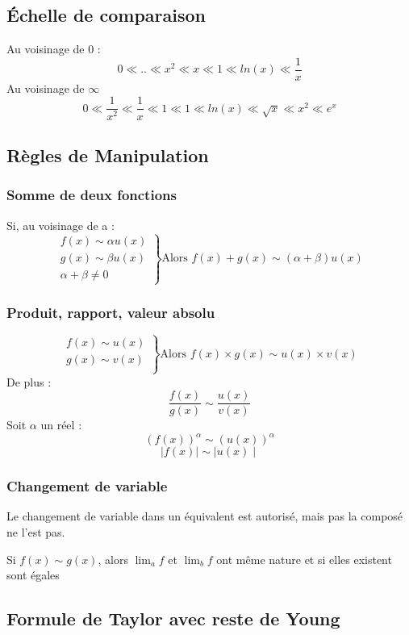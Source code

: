 \subsection{Échelle de comparaison}
Au voisinage de 0 :
$$0 \ll .. \ll x^2 \ll x \ll 1 \ll ln(x) \ll \dfrac{1}{x}$$
Au voisinage de $\infty$
$$0 \ll \dfrac{1}{x^2} \ll \dfrac{1}{x} \ll 1 \ll 1 \ll ln(x) \ll \sqrt{x} \ll x^2 \ll e^x$$
\subsection{Règles de Manipulation}
\subsubsection{Somme de deux fonctions}
Si, au voisinage de a :
\[\left.\begin{array}{l}
   f(x) \sim \alpha u(x)\\
   g(x) \sim \beta u(x) \\
   \alpha + \beta \neq 0
  \end{array}\right\}
\mbox{Alors } f(x)+g(x) \sim (\alpha+\beta) u(x)\]
\subsubsection{Produit, rapport, valeur absolu}
\[\left.\begin{array}{l}
   f(x) \sim u(x)\\
   g(x) \sim v(x)\\
  \end{array}\right\}
\mbox{Alors } f(x)\times g(x) \sim u(x)\times v(x)\]
De plus : 
$$\dfrac{f(x)}{g(x)}\sim \dfrac{u(x)}{v(x)}$$
Soit $\alpha$ un réel :
$$(f(x))^{\alpha} \sim (u(x))^{\alpha}$$
$$\mid f(x) \mid \sim \mid u(x)\mid$$
\subsubsection{Changement de variable}
Le changement de variable dans un équivalent est autorisé, mais pas la composé ne l'est pas.
\begin{prop}
 Si $f(x) \sim g(x)$, alors $\lim_{a}f$ et $\lim_{b}f$ ont même nature et si elles existent sont égales
\end{prop}
\subsection{Formule de Taylor avec reste de Young}
